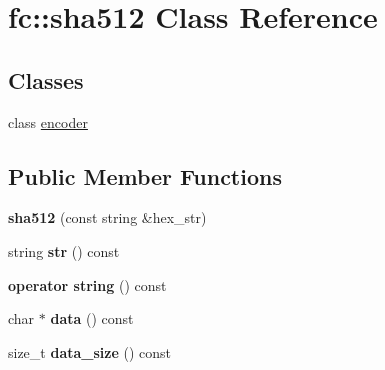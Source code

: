 \hypertarget{classfc_1_1sha512}{}\section{fc\+:\+:sha512 Class Reference}
\label{classfc_1_1sha512}
\subsection*{Classes}
\begin{DoxyCompactItemize}
\item 
class \mbox{\hyperlink{classfc_1_1sha512_1_1encoder}{encoder}}
\end{DoxyCompactItemize}
\subsection*{Public Member Functions}
\begin{DoxyCompactItemize}
\item 
\mbox{\label{classfc_1_1sha512_a7d94e9705981b9525743895e21d30f18}} 
{\bfseries sha512} (const string \&hex\+\_\+str)
\item 
\mbox{\label{classfc_1_1sha512_a94f58247f376906e4be66d3e1dea2432}} 
string {\bfseries str} () const
\item 
\mbox{\label{classfc_1_1sha512_afcbbd13dec4aff1dec94a708d6ef4e64}} 
{\bfseries operator string} () const
\item 
\mbox{\label{classfc_1_1sha512_a9d667a4c29610becf17b9ae56167edee}} 
char $\ast$ {\bfseries data} () const
\item 
\mbox{\label{classfc_1_1sha512_afa55404a04cdf7b0fe3e13579f141d35}} 
size\+\_\+t {\bfseries data\+\_\+size} () const
\end{DoxyCompactItemize}
